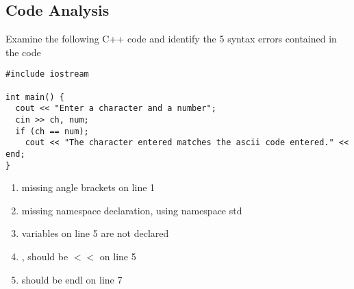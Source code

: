 \documentclass[11pt,answers]{exam}
\begin{document}
\begin{questions}


\newpage

\section*{Code Analysis}

\question[15] Examine the following C++ code and identify the 5 syntax errors contained in the code
\begin{lstlisting}
#include iostream

int main() {
  cout << "Enter a character and a number";
  cin >> ch, num;
  if (ch == num);
    cout << "The character entered matches the ascii code entered." << end;
}
\end{lstlisting}
\begin{solution}
  \begin{enumerate}
   \item missing angle brackets on line 1
   \item missing namespace declaration, using namespace std
   \item variables on line 5 are not declared
   \item , should be $<<$ on line 5 
   \item should be endl on line 7
  \end{enumerate}
  

\end{solution}
\end{questions}
\end{document}

